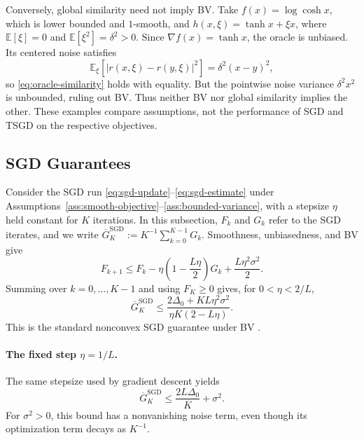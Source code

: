 Conversely, global similarity need not imply BV. Take
$f(x)=\log\cosh x$, which is lower bounded and $1$-smooth, and
$h(x,\xi)=\tanh x+\xi x$, where $\mathbb E[\xi]=0$ and
$\mathbb E[\xi^2]=\delta^2>0$. Since $\nabla f(x)=\tanh x$,
the oracle is unbiased. Its centered noise satisfies
\[
\mathbb E_{\xi}[|r(x,\xi)-r(y,\xi)|^2]
=\delta^2(x-y)^2,
\]
so \eqref{eq:oracle-similarity} holds with equality. But the
pointwise noise variance $\delta^2x^2$ is unbounded, ruling out BV.
Thus neither BV nor global similarity implies the other. These
examples compare assumptions, not the performance of SGD and TSGD
on the respective objectives.

\subsection{SGD Guarantees}
\label{subsec:sgd-guarantees}

Consider the SGD run \eqref{eq:sgd-update}--\eqref{eq:sgd-estimate}
under Assumptions~\ref{ass:smooth-objective}--\ref{ass:bounded-variance},
with a stepsize $\eta$ held constant for $K$ iterations. In this
subsection, $F_k$ and $G_k$ refer to the SGD iterates, and we write
$\overline G_K^{\mathrm{SGD}}:=K^{-1}\sum_{k=0}^{K-1}G_k$.
Smoothness, unbiasedness, and BV give
\[
F_{k+1}\leq F_k-\eta\left(1-\frac{L\eta}{2}\right)G_k
                   +\frac{L\eta^2\sigma^2}{2}.
\]
Summing over $k=0,\ldots,K-1$ and using $F_K\geq0$ gives, for
$0<\eta<2/L$,
\begin{equation}
\label{eq:sgd-bv-bound}
\boxed{\overline G_K^{\mathrm{SGD}}
\leq\frac{2\Delta_0+KL\eta^2\sigma^2}
          {\eta K(2-L\eta)}.}
\end{equation}
This is the standard nonconvex SGD guarantee under BV
\citep{ghadimi2013stochastic}.

\paragraph{The fixed step $\eta=1/L$.}
The same stepsize used by gradient descent yields
\begin{equation}
\label{eq:sgd-bv-fixed-step}
\boxed{\overline G_K^{\mathrm{SGD}}
\leq\frac{2L\Delta_0}{K}+\sigma^2.}
\end{equation}
For $\sigma^2>0$, this bound has a nonvanishing noise term, even
though its optimization term decays as $K^{-1}$.

